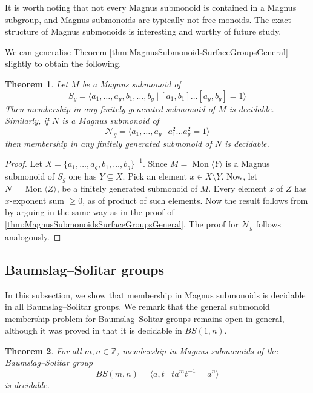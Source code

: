 \documentclass[11pt]{amsart}
\newcommand{\Mgen}[1]{\operatorname{Mon}\bigl\langle #1 \bigr\rangle}
\newcommand{\Gpres}[2]{\bigl\langle #1\:|\:#2 \bigr\rangle}
\theoremstyle{plain}
\newtheorem{theorem}{Theorem}[section]
\theoremstyle{definition}
\begin{document}
       


It is worth noting that not every Magnus submonoid is contained in a Magnus subgroup, and Magnus submonoids are typically not free monoids. The exact structure of Magnus submonoids is interesting and worthy of future study.

We can generalise Theorem \ref{thm:MagnusSubmonoidsSurfaceGroupsGeneral} slightly to obtain the following. 
\begin{theorem}\label{thm:surface:magnus:sub}
Let $M$ be a Magnus submonoid of  
\[
S_g = \Gpres{a_1, \ldots, a_g, b_1, \ldots, b_g}{[a_1,b_1]\ldots[a_g,b_g] = 1}
\]
Then membership in any finitely generated submonoid of $M$ is decidable.
Similarly, if $N$ is a 
Magnus submonoid of 
\[
\mathcal{N}_g = \Gpres{a_1, \ldots, a_g}{a_1^2 \ldots a_g^2 = 1}
\]
then membership in any finitely generated submonoid of $N$ is decidable.
\end{theorem}

\begin{proof}
Let $X = \{a_1, \ldots, a_g, b_1, \ldots, b_g\}^{\pm 1}$. Since $M = \Mgen{Y}$ is a Magnus submonoid of $S_g$ one has $Y \subsetneq X$. Pick an element $x \in X \setminus Y$. Now, let $N = \Mgen{Z}$, be a finitely generated submonoid of $M$. Every element $z$ of $Z$ has $x$-exponent sum $\geq 0$, as of product of such elements. Now the result follows from  by arguing in the same way as in the proof of \cref{thm:MagnusSubmonoidsSurfaceGroupsGeneral}. The proof for $\mathcal{N}_g$ follows analogously. 
\end{proof}


\subsection{Baumslag--Solitar groups}

In this subsection, we show that membership in Magnus submonoids is decidable in all Baumslag--Solitar groups. We remark that the general submonoid membership problem for Baumslag--Solitar groups remains open in general, although it was proved in \cite{Cadilhac2020rational} that it is decidable in $BS(1,n)$.      


\begin{theorem}\label{thm: magnus in BS groups}
For all $m, n \in \mathbb{Z}$, membership in Magnus submonoids of the Baumslag--Solitar group 
\[
BS(m,n) = \langle a, t \mid t a^m t^{-1} = a^n \rangle
\]
is decidable.
\end{theorem}
\end{document}
